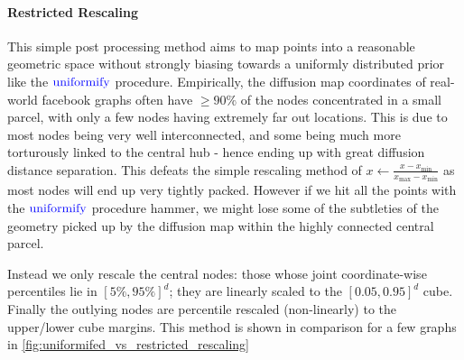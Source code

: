 \paragraph{Restricted Rescaling} This simple post processing method aims to map points into a reasonable geometric space without strongly biasing towards a uniformly distributed prior like the $\operatorname{\textcolor{blue}{uniformify}}$ procedure.
Empirically, the diffusion map coordinates of real-world facebook graphs often have $\geq 90\%$ of the nodes concentrated in a small parcel, with only a few nodes having extremely far out locations. This is due to most nodes being very well interconnected, and some being much more torturously linked to the central hub - hence ending up with great diffusion distance separation.
This defeats the simple rescaling method of $x \gets \frac{x - x_{\min}}{x_{\max} - x_{\min}}$ as most nodes will end up very tightly packed. However if we hit all the points with the $\operatorname{\textcolor{blue}{uniformify}}$ procedure hammer, we might lose some of the subtleties of the geometry picked up by the diffusion map within the highly connected central parcel.

Instead we only rescale the central nodes: those whose joint coordinate-wise percentiles lie in $[5\%, 95\%]^d$; they are linearly scaled to the $[0.05, 0.95]^d$ cube. Finally the outlying nodes are percentile rescaled (non-linearly) to the upper/lower cube margins.
This method is shown in comparison for a few graphs in \cref{fig:uniformifed_vs_restricted_rescaling}





